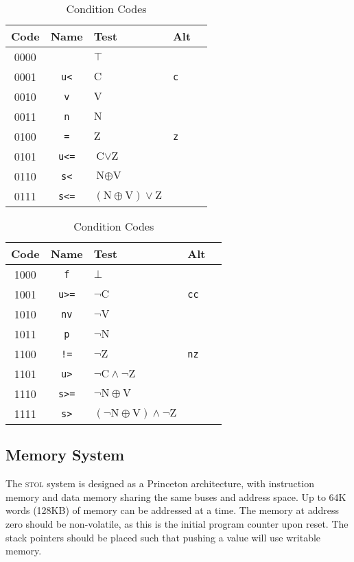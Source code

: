 \documentclass[12pt,english]{book}
\begin{document}
\begin{table}[htb]\centering
  \caption{Condition Codes}
  \label{tbl:cond}
  \begin{tabular}{cclll}
    \toprule
    Code&Name&Test&Alt\\\midrule
    0000&&\(\top\)\\
    0001&\texttt{u<}&\(\text{C}\)&\texttt{c}\\
    0010&\texttt{v}&\(\text{V}\)\\
    0011&\texttt{n}&\(\text{N}\)\\
    0100&\texttt{=}&\(\text{Z}\)&\texttt{z}\\
    0101&\texttt{u<=}&\(\text{C}\vee\text{Z}\)\\
    0110&\texttt{s<}&\(\text{N}\oplus\text{V}\)\\
    0111&\texttt{s<=}&\((\text{N}\oplus\text{V})\vee\text{Z}\)\\
    \bottomrule
  \end{tabular}\qquad
  \begin{tabular}{cclll}
    \toprule
    Code&Name&Test&Alt\\\midrule
    1000&\texttt{f}&\(\bot\)\\
    1001&\texttt{u>=}&\(\neg\text{C}\)&\texttt{cc}\\
    1010&\texttt{nv}&\(\neg\text{V}\)\\
    1011&\texttt{p}&\(\neg\text{N}\)\\
    1100&\texttt{!=}&\(\neg\text{Z}\)&\texttt{nz}\\
    1101&\texttt{u>}&\(\neg\text{C}\wedge\neg\text{Z}\)\\
    1110&\texttt{s>=}&\(\neg\text{N}\oplus\text{V}\)\\
    1111&\texttt{s>}&\((\neg\text{N}\oplus\text{V})\wedge\neg\text{Z}\)\\
    \bottomrule
  \end{tabular}
\end{table}

\subsection{Memory System}
The \textsc{stol} system is designed as a Princeton architecture,
with instruction memory and data memory sharing
the same buses and address space.
Up to 64K words (128KB) of memory can be addressed at a time.
The memory at address zero should be non-volatile,
as this is the initial program counter upon reset.
The stack pointers should be placed
such that pushing a value will use writable memory.
\end{document}
